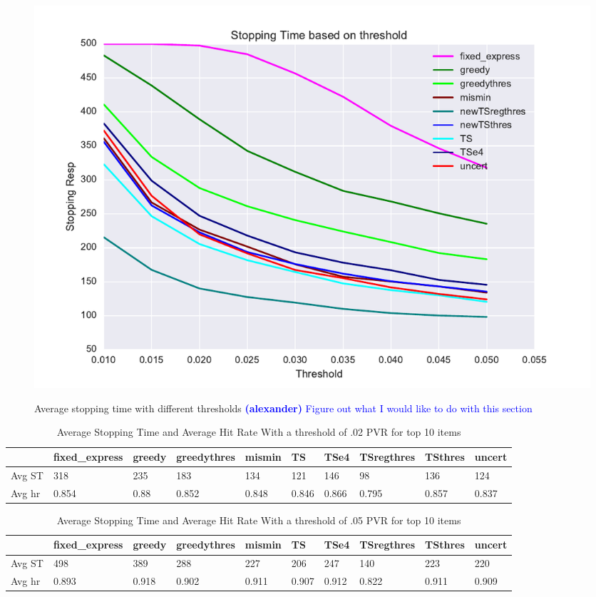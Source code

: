 \documentclass[nonblindrev]{informs3}
\newcommand{\alexander}[1]{\textcolor{blue}{\textbf{(alexander)} #1}}
\begin{document}
\begin{figure}
\caption{Average stopping time with different thresholds \alexander{Figure out what I would like to do with this section}}
\includegraphics[width=1\textwidth]{plots/stoppingtimes.pdf}
\label{fig:st}
\end{figure}
\begin{table}
\begin{center}
\begin{tabular}{llllllllll}
\hline    &  fixed\_express &  greedy &  greedythres &  mismin &    TS &  TSe4 &  TSregthres &  TSthres &  uncert \\\hline  Avg ST  & 318 &   235 & 183 & 134 & 121 & 146 & 	98 &	136 &   124 \\  Avg hr  &  0.854 &  0.88 & 0.852&0.848 & 0.846 & 	0.866 & 0.795 &0.857 &  0.837 \end{tabular}
\end{center}
\caption{Average Stopping Time and Average Hit Rate With a threshold of .02 PVR for top 10 items}
\label{table:st2}
\end{table}
\begin{table}
\begin{center}
\begin{tabular}{llllllllll}
\hline    &  fixed\_express &  greedy &  greedythres &  mismin &    TS &  TSe4 &  TSregthres &  TSthres &  uncert \\\hline    Avg ST & 498 & 389 & 288 & 227 & 206 & 247 & 140 &223 &  220 \\ Avg hr & 0.893 &0.918&0.902& 	0.911 & 0.907& 0.912 & 0.822&0.911& 0.909\end{tabular}
\end{center}
\caption{Average Stopping Time and Average Hit Rate With a threshold of .05 PVR for top 10 items}
\label{table:st5}
\end{table}
\end{document}
